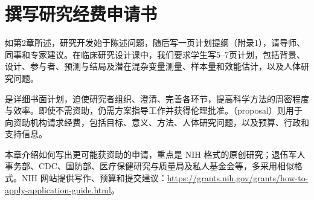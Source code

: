 \chapter{撰写研究经费申请书}
如第2章所述，研究开发始于陈述问题，随后写一页计划提纲（附录1），请导师、同事和专家建议。在临床研究设计课中，我们要求学生写5--7页计划，包括背景、设计、参与者、预测与结局及潜在混杂变量测量、样本量和效能估计，以及人体研究问题。

是详细书面计划，迫使研究者组织、澄清、完善各环节，提高科学方法的周密程度与效率。即使不需资助，仍需方案指导工作并获得伦理批准。（proposal）则用于向资助机构请求经费，包括目标、意义、方法、人体研究问题，以及预算、行政和支持信息。

本章介绍如何写出更可能获资助的申请，重点是 NIH 格式的原创研究；退伍军人事务部、CDC、国防部、医疗保健研究与质量局及私人基金会等，多采用相似格式。NIH 网站提供写作、预算和提交建议：\url{https://grants.nih.gov/grants/how-to-apply-application-guide.html}。
